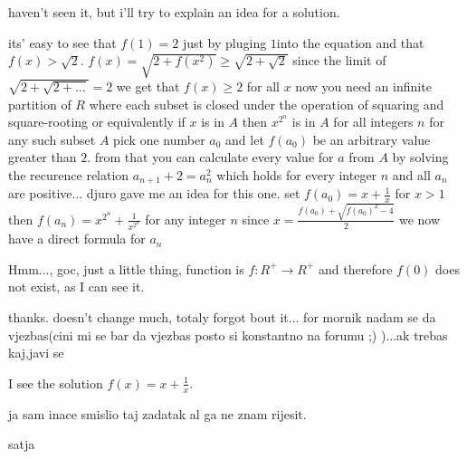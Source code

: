 \begin{mysolution}
	haven't seen it, but i'll try to explain an idea for a solution.

its' easy to see that $f(1)=2$ just by pluging $1$into the equation and that $f(x)>\sqrt{2}$.
$f(x)=\sqrt{2+f(x^{2})}\geq \sqrt{2+\sqrt{2}}$ since the limit of $\sqrt{2+\sqrt{2+...}}=2$ we get that $f(x)\geq 2$ for all $x$
now you need an infinite partition of $R$ where each subset is closed under the operation of squaring and square-rooting or equivalently 
if $x$ is in $A$ then $x^{2^{n}}$ is in $A$ for all integers $n$
for any such subset $A$ pick one number $a_{0}$ and let $f(a_{0})$ be an arbitrary value greater than $2$. from that you can calculate every value for $a$ from $A$ by solving the recurence relation $a_{n+1}+2=a_{n}^{2}$ which holds for every integer $n$ and all $a_{n}$ are positive...
djuro gave me an idea for this one.
set $f(a_{0})=x+\frac{1}{x}$ for $x>1$ then $f(a_{n})=x^{2^{n}}+\frac{1}{x^{2^{n}}}$ for any integer $n$
since $x=\frac{f(a_{0})+\sqrt{f(a_{0})^{2}-4}}{2}$ we now have a direct formula for $a_{n}$
 

\end{mysolution}



\begin{mysolution}
	Hmm..., goc, just a little thing, function is $f: R^{+}\to R^{+}$ and therefore $f(0)$ does not exist, as I can see it.
\end{mysolution}



\begin{mysolution}
	thanks. doesn't change much, totaly forgot bout it...
for mornik
nadam se da vjezbas(cini mi se bar da vjezbas posto si konstantno na forumu ;) )...ak trebas kaj,javi se
\end{mysolution}



\begin{mysolution}
	I see the solution $f(x) = x+\frac{1}{ x}$.

ja sam inace smislio taj zadatak al ga ne znam rijesit.

satja
\end{mysolution}



